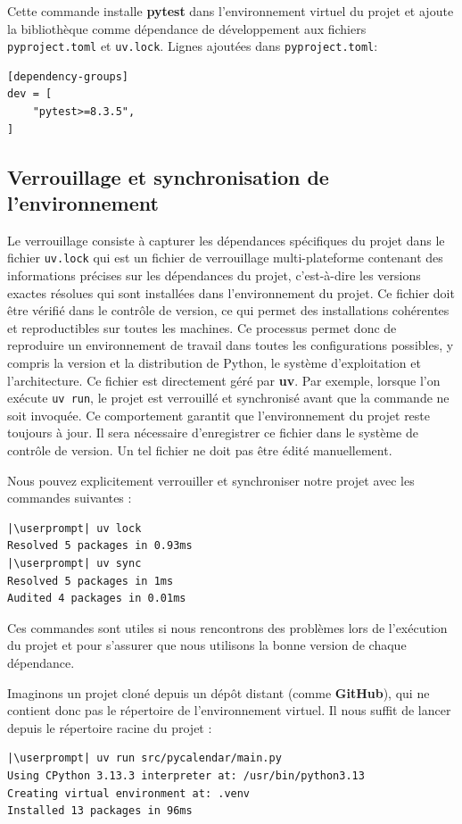 Cette commande installe \textbf{pytest} dans l'environnement virtuel du projet et ajoute la bibliothèque comme dépendance de développement aux fichiers \texttt{pyproject.toml} et \texttt{uv.lock}. Lignes ajoutées dans \texttt{pyproject.toml}:
\begin{lstlisting}[style=file]
[dependency-groups]
dev = [
    "pytest>=8.3.5",
]
\end{lstlisting}

\subsection*{Verrouillage et synchronisation de l'environnement}
Le verrouillage consiste à capturer les dépendances spécifiques du projet dans le fichier \texttt{uv.lock} qui est un fichier de verrouillage multi-plateforme contenant des informations précises sur les dépendances du projet, c'est-à-dire les versions exactes résolues qui sont installées dans l'environnement du projet. Ce fichier doit être vérifié dans le contrôle de version, ce qui permet des installations cohérentes et reproductibles sur toutes les machines. Ce processus permet donc de reproduire un environnement de travail dans toutes les configurations possibles, y compris la version et la distribution de Python, le système d'exploitation et l'architecture. Ce fichier est directement géré par \textbf{uv}. Par exemple, lorsque l'on exécute \texttt{uv run}, le projet est verrouillé et synchronisé avant que la commande ne soit invoquée. Ce comportement garantit que l'environnement du projet reste toujours à jour. Il sera nécessaire d'enregistrer ce fichier dans le système de contrôle de version. Un tel fichier ne doit pas être édité manuellement.

Nous pouvez explicitement verrouiller et synchroniser notre projet avec les commandes suivantes :
\begin{lstlisting}[style=bash]
|\userprompt| uv lock
Resolved 5 packages in 0.93ms
|\userprompt| uv sync
Resolved 5 packages in 1ms
Audited 4 packages in 0.01ms
\end{lstlisting}

Ces commandes sont utiles si nous rencontrons des problèmes lors de l'exécution du projet et pour s'assurer que nous utilisons la bonne version de chaque dépendance.

Imaginons un projet cloné depuis un dépôt distant (comme \textbf{GitHub}), qui ne contient donc pas le répertoire de l'environnement virtuel. Il nous suffit de lancer depuis le répertoire racine du projet :
\begin{lstlisting}[style=bash]
|\userprompt| uv run src/pycalendar/main.py
Using CPython 3.13.3 interpreter at: /usr/bin/python3.13
Creating virtual environment at: .venv
Installed 13 packages in 96ms
\end{lstlisting}

